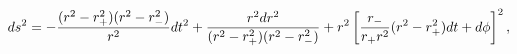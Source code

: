 \begin{equation} \label{rbtzb}
ds^2 = - {(r^2- r_+^2)(r^2-r_-^2) \over r^2} dt^2 + {r^2 dr^2 \over
  (r^2 - r_+^2)(r^2 - r_-^2)} + r^2 \left[ {r_- \over r_+ r^2} (r^2 -
  r_+^2) dt + d \phi \right]^2,
\end{equation}


